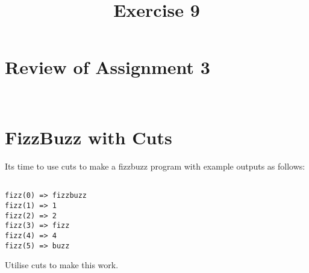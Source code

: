 \documentclass{article}
\title{Exercise 9}
\begin{document}
\maketitle
\section{Review of Assignment 3}
~\\[5cm]

\section{FizzBuzz with Cuts}

Its time to use cuts to make a fizzbuzz program with example outputs as follows:
\begin{verbatim}

fizz(0) => fizzbuzz
fizz(1) => 1
fizz(2) => 2
fizz(3) => fizz
fizz(4) => 4
fizz(5) => buzz

\end{verbatim}


Utilise cuts to make this work.
\end{document}

